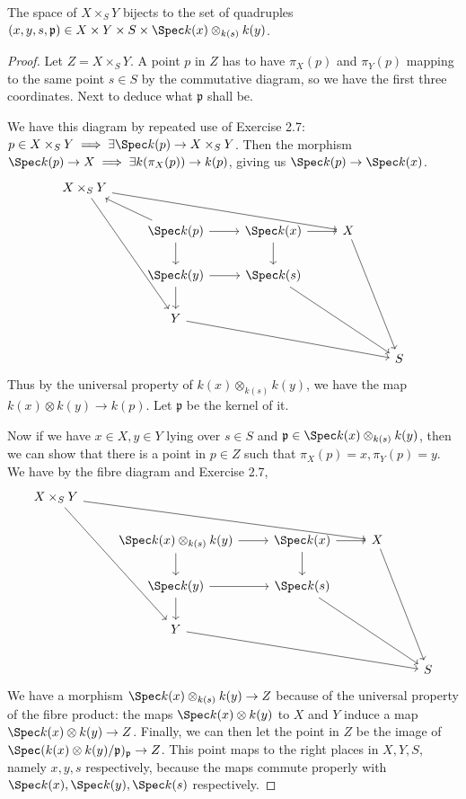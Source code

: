 \begin{lem}\label{lem:fibres_of_product}
	The space of $X \times _S Y$ bijects to the set of quadruples $(x,y,s,\mathfrak{p}) \in X \times Y \times S \times \Spec k(x) \otimes_{k(s)} k(y)$.
\end{lem}
\begin{proof}
	Let $Z = X \times _S Y $.
	A point $p $ in $Z$ has to have $\pi _X(p)$ and $\pi _Y(p) $ mapping to the same point $s\in S $ by the commutative diagram, so we have the first three coordinates.
	Next to deduce what $\mathfrak{p} $ shall be.

	We have this diagram by repeated use of Exercise 2.7: $p \in X \times _S Y\implies \exists \Spec k(p) \to X \times _S Y$.
	Then the morphism $\Spec k(p) \to X \implies \exists k(\pi _X(p)) \to k(p)$, giving us $\Spec k(p) \to \Spec k(x) $.
\[\begin{tikzcd}
	{X \times_S Y} \\
	& {\Spec k(p)} & {\Spec k(x)} & X \\
	& {\Spec k(y)} & {\Spec k(s)} \\
	& Y \\
	&&&& S
	\arrow[from=1-1, to=2-4]
	\arrow[from=1-1, to=4-2]
	\arrow[from=2-2, to=1-1]
	\arrow[from=2-2, to=2-3]
	\arrow[from=2-2, to=3-2]
	\arrow[from=2-3, to=2-4]
	\arrow[from=2-3, to=3-3]
	\arrow[from=2-4, to=5-5]
	\arrow[from=3-2, to=3-3]
	\arrow[from=3-2, to=4-2]
	\arrow[from=3-3, to=5-5]
	\arrow[from=4-2, to=5-5]
\end{tikzcd}\]
	Thus by the universal property of $k(x)\otimes _{k(s)} k(y) $, we have the map $k(x) \otimes k(y) \to k(p) $.
	Let $\mathfrak{p} $ be the kernel of it.

	Now if we have $x\in X, y\in Y $ lying over $s\in S $ and $\mathfrak{p}\in \Spec k(x) \otimes_{k(s)} k(y)$, then we can show that there is a point in $p \in Z$ such that $\pi _X(p) = x, \pi _Y(p) = y $.
	We have by the fibre diagram and Exercise 2.7,
\[\begin{tikzcd}
	{X \times_S Y} \\
	& {\Spec k(x)\otimes _{k(s)} k(y)} & {\Spec k(x)} & X \\
	& {\Spec k(y)} & {\Spec k(s)} \\
	& Y \\
	&&&& S
	\arrow[from=1-1, to=2-4]
	\arrow[from=1-1, to=4-2]
	\arrow[from=2-2, to=2-3]
	\arrow[from=2-2, to=3-2]
	\arrow[from=2-3, to=2-4]
	\arrow[from=2-3, to=3-3]
	\arrow[from=2-4, to=5-5]
	\arrow[from=3-2, to=3-3]
	\arrow[from=3-2, to=4-2]
	\arrow[from=3-3, to=5-5]
	\arrow[from=4-2, to=5-5]
\end{tikzcd}\]
	We have a morphism $\Spec k(x) \otimes_{k(s)} k(y) \to Z $ because of the universal property of the fibre product: the maps $\Spec k(x) \otimes k(y) $ to $X $ and $Y $ induce a map $\Spec k(x) \otimes k(y) \to Z $.
	Finally, we can then let the point in $Z $ be the image of $\Spec (k(x) \otimes k(y) / \mathfrak{p})_{\mathfrak{p}} \to Z $.
	This point maps to the right places in $X,Y,S $, namely $x,y,s $ respectively, because the maps commute properly with $\Spec k(x),\Spec k(y), \Spec k(s) $ respectively.


\end{proof}
